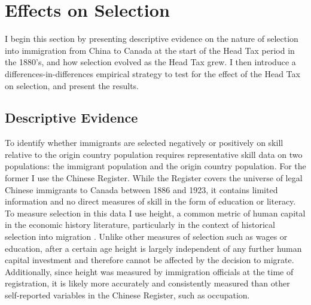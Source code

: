 \section{Effects on Selection}
I begin this section by presenting descriptive evidence on the nature of selection into immigration from China to Canada at the start of the Head Tax period in the 1880's, and how selection evolved as the Head Tax grew. I then introduce a differences-in-differences empirical strategy to test for the effect of the Head Tax on selection, and present the results.

\subsection{Descriptive Evidence}
To identify whether immigrants are selected negatively or positively on skill relative to the origin country population requires representative skill data on two populations: the immigrant population and the origin country population. For the former I use the Chinese Register. While the Register covers the universe of legal Chinese immigrants to Canada between 1886 and 1923, it contains limited information and no direct measures of skill in the form of education or literacy. To measure selection in this data I use height, a common metric of human capital in the economic history literature, particularly in the context of historical selection into migration \citep{humphriesleunig2009,stolzbaten2012,kosackward2014,EscamillaGuerreroLopezAlonso2023}. 
Unlike other measures of selection such as wages or education, after a certain age height is largely independent of any further human capital investment and therefore cannot be affected by the decision to migrate. Additionally, since height was measured by immigration officials at the time of registration, it is likely more accurately and consistently measured than other self-reported variables in the Chinese Register, such as occupation.

